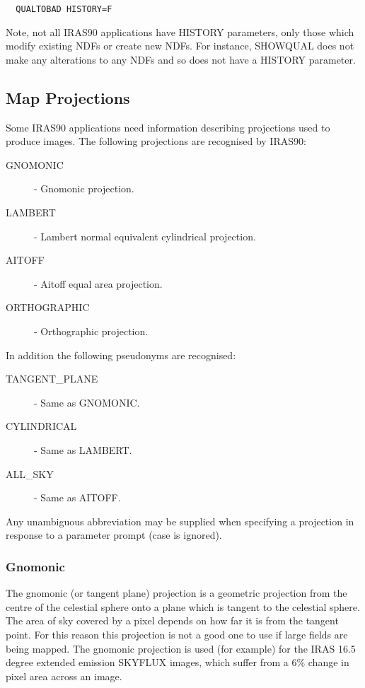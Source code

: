 \small
\begin{verbatim}
  QUALTOBAD HISTORY=F
\end{verbatim}
\normalsize
Note, not all {\small IRAS90} applications have {\small HISTORY}
parameters, only  those which modify existing {\small NDF}s or create
new {\small NDF}s. For  instance, {\small SHOWQUAL} does not make any
alterations to any {\small NDF}s and so does not have a {\small
HISTORY} parameter.

\subsection{Map Projections}
\label{SEC:PROJ}
Some {\small IRAS90} applications need information describing projections
used to produce images. The following projections are recognised
by {\small IRAS90}: 
\begin{description}
\item [GNOMONIC]     - Gnomonic projection.
\item [LAMBERT]      - Lambert normal equivalent cylindrical projection.
\item [AITOFF]       - Aitoff equal area projection.
\item [ORTHOGRAPHIC] - Orthographic projection.
\end{description}

In addition the following pseudonyms are recognised:
\begin{description}

\item [TANGENT\_PLANE] - Same as GNOMONIC.
\item [CYLINDRICAL]   - Same as LAMBERT.
\item [ALL\_SKY]       - Same as AITOFF.
\end{description}

Any unambiguous abbreviation may be supplied when specifying a 
projection in response to a parameter prompt (case is ignored).

\subsubsection{Gnomonic}
The gnomonic (or tangent plane) projection is a geometric
projection from the centre of the celestial sphere onto a plane
which is tangent to the celestial sphere. The area of sky
covered by a pixel depends on how far it is from the tangent
point. For this reason this projection is not a good one to use
if large fields are being mapped. The gnomonic projection is
used (for example) for the {\small IRAS} 16.5 degree extended emission
{\small SKYFLUX} images, which suffer from a 6\% change in pixel area 
across an image.

